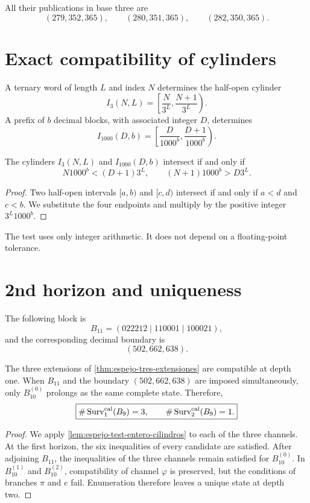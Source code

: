 All their publications in base three are
\[
 (279,352,365),
 \qquad
 (280,351,365),
 \qquad
 (282,350,365).
\]

\section{Exact compatibility of cylinders}

A ternary word of length \(L\) and index \(N\) determines the half-open
cylinder
\[
 I_3(N,L)=\left[\frac{N}{3^L},\frac{N+1}{3^L}\right).
\]
A prefix of \(b\) decimal blocks, with associated integer \(D\), determines
\[
 I_{1000}(D,b)=
 \left[\frac{D}{1000^b},\frac{D+1}{1000^b}\right).
\]

\begin{lemma}
\label{lem:espejo-test-entero-cilindros}
The cylinders \(I_3(N,L)\) and \(I_{1000}(D,b)\) intersect if and only if
\[
 N1000^b<(D+1)3^L,
 \qquad
 (N+1)1000^b>D3^L.
\]
\end{lemma}

\begin{proof}
Two half-open intervals \([a,b)\) and \([c,d)\) intersect if and only if \(a<d\) and \(c<b\). We substitute the four endpoints and multiply by the positive integer \(3^L1000^b\).
\end{proof}

The test uses only integer arithmetic. It does not depend on a floating-point tolerance.

\section{2nd horizon and uniqueness}

The following block is
\[
 B_{11}=(022212\mid110001\mid100021),
\]
and the corresponding decimal boundary is
\[
 (502,662,638).
\]

\begin{theorem}
\label{thm:espejo-seleccion-tres-uno}
The three extensions of \cref{thm:espejo-tres-extensiones} are compatible at depth one. When
\(B_{11}\) and the boundary \((502,662,638)\) are imposed simultaneously,
only \(B_{10}^{(0)}\) prolongs as the same complete state. Therefore,
\[
 \boxed{
 \#\operatorname{Surv}^{\rm cal}_1(B_9)=3,
 \qquad
 \#\operatorname{Surv}^{\rm cal}_2(B_9)=1.}
\]
\end{theorem}

\begin{proof}
We apply \cref{lem:espejo-test-entero-cilindros} to each of the three
channels. At the first horizon, the six inequalities of every candidate are
satisfied. After adjoining \(B_{11}\), the inequalities of the three channels
remain satisfied for \(B_{10}^{(0)}\). In \(B_{10}^{(1)}\) and
\(B_{10}^{(2)}\), compatibility of channel \(\varphi\) is preserved, but
the conditions of branches \(\pi\) and \(e\) fail. Enumeration therefore
leaves a unique state at depth two.
\end{proof}

